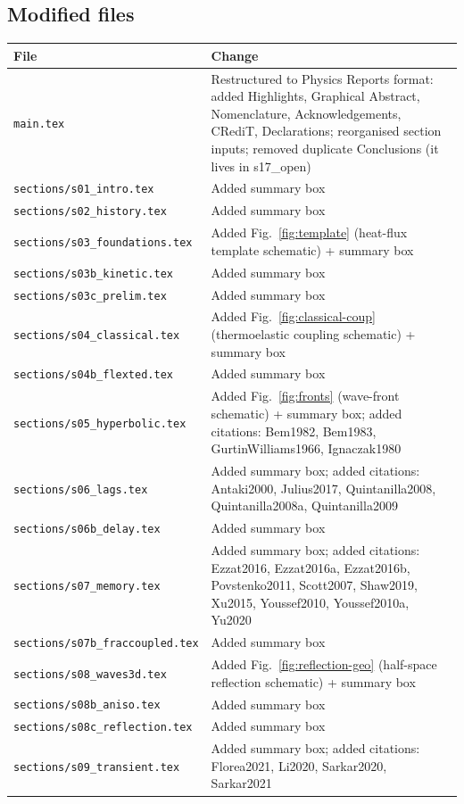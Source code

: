\documentclass[12pt,a4paper]{article}
\begin{document}
\subsection*{Modified files}
\begin{tabularx}{\textwidth}{@{}lX@{}}\toprule
\textbf{File} & \textbf{Change}\\\midrule
{\tt main.tex} & Restructured to Physics Reports format: added Highlights, Graphical Abstract, Nomenclature, Acknowledgements, CRediT, Declarations; reorganised section inputs; removed duplicate Conclusions (it lives in s17\_open)\\
{\tt sections/s01\_intro.tex} & Added summary box\\
{\tt sections/s02\_history.tex} & Added summary box\\
{\tt sections/s03\_foundations.tex} & Added Fig.~\ref*{fig:template} (heat-flux template schematic) + summary box\\
{\tt sections/s03b\_kinetic.tex} & Added summary box\\
{\tt sections/s03c\_prelim.tex} & Added summary box\\
{\tt sections/s04\_classical.tex} & Added Fig.~\ref*{fig:classical-coup} (thermoelastic coupling schematic) + summary box\\
{\tt sections/s04b\_flexted.tex} & Added summary box\\
{\tt sections/s05\_hyperbolic.tex} & Added Fig.~\ref*{fig:fronts} (wave-front schematic) + summary box; added citations: Bem1982, Bem1983, GurtinWilliams1966, Ignaczak1980\\
{\tt sections/s06\_lags.tex} & Added summary box; added citations: Antaki2000, Julius2017, Quintanilla2008, Quintanilla2008a, Quintanilla2009\\
{\tt sections/s06b\_delay.tex} & Added summary box\\
{\tt sections/s07\_memory.tex} & Added summary box; added citations: Ezzat2016, Ezzat2016a, Ezzat2016b, Povstenko2011, Scott2007, Shaw2019, Xu2015, Youssef2010, Youssef2010a, Yu2020\\
{\tt sections/s07b\_fraccoupled.tex} & Added summary box\\
{\tt sections/s08\_waves3d.tex} & Added Fig.~\ref*{fig:reflection-geo} (half-space reflection schematic) + summary box\\
{\tt sections/s08b\_aniso.tex} & Added summary box\\
{\tt sections/s08c\_reflection.tex} & Added summary box\\
{\tt sections/s09\_transient.tex} & Added summary box; added citations: Florea2021, Li2020, Sarkar2020, Sarkar2021\\

\end{tabularx}
\end{document}
